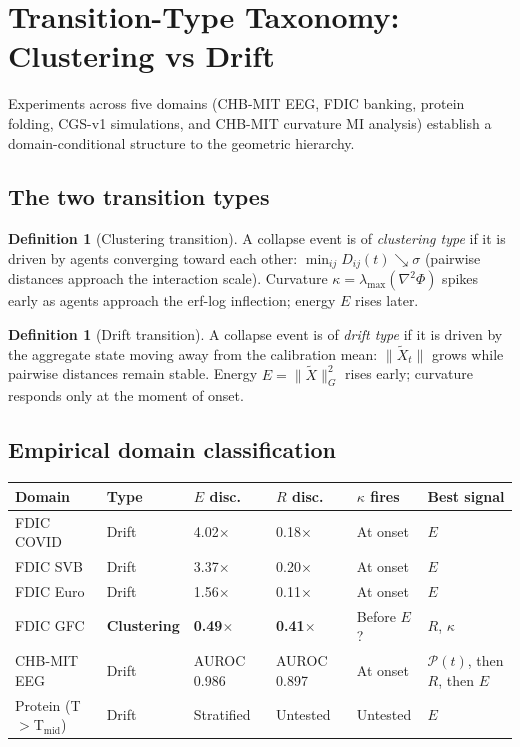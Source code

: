 \documentclass[11pt,a4paper]{article}
\theoremstyle{definition}
\newtheorem{definition}[theorem]{Definition}
\begin{document}
\section{Transition-Type Taxonomy: Clustering vs Drift}
\label{sec:transition_types}

\noindent
Experiments across five domains (CHB-MIT EEG, FDIC banking, protein folding,
CGS-v1 simulations, and CHB-MIT curvature MI analysis)
establish a domain-conditional structure to the geometric hierarchy.

\subsection{The two transition types}

\begin{definition}[Clustering transition]
A collapse event is of \emph{clustering type} if it is driven by agents
converging toward each other: $\min_{ij} D_{ij}(t) \searrow \sigma$
(pairwise distances approach the interaction scale).
Curvature $\kappa = \lambda_\mathrm{max}(\nabla^2\Phi)$ spikes early
as agents approach the erf-log inflection; energy $E$ rises later.
\end{definition}

\begin{definition}[Drift transition]
A collapse event is of \emph{drift type} if it is driven by the aggregate
state moving away from the calibration mean: $\|\tilde X_t\|$ grows while
pairwise distances remain stable.
Energy $E = \|\tilde X\|_G^2$ rises early; curvature responds only at
the moment of onset.
\end{definition}

\subsection{Empirical domain classification}

\begin{center}
\renewcommand{\arraystretch}{1.3}
\begin{tabular}{llllll}
\toprule
\textbf{Domain} & \textbf{Type} & \textbf{$E$ disc.} & \textbf{$R$ disc.}
  & \textbf{$\kappa$ fires} & \textbf{Best signal} \\
\midrule
FDIC COVID & Drift & 4.02$\times$ & 0.18$\times$ & At onset & $E$ \\
FDIC SVB   & Drift & 3.37$\times$ & 0.20$\times$ & At onset & $E$ \\
FDIC Euro  & Drift & 1.56$\times$ & 0.11$\times$ & At onset & $E$ \\
FDIC GFC   & \textbf{Clustering} & \textbf{0.49$\times$} & \textbf{0.41$\times$} & Before $E$? & $R$, $\kappa$ \\
CHB-MIT EEG & Drift & AUROC 0.986 & AUROC 0.897 & At onset & $\mathcal{P}(t)$, then $R$, then $E$ \\
Protein (T$>$T$_\mathrm{mid}$) & Drift & Stratified & Untested & Untested & $E$ \\
\bottomrule
\end{tabular}
\end{center}
\end{document}
